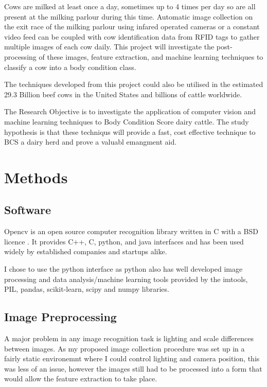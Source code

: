 \documentclass[11pt]{article}
\begin{document}
		
		Cows are milked at least once a day, sometimes up to 4 times per day so are all present at the milking parlour during this time.
		Automatic image collection on the exit race of the milking parlour using infared operated cameras or a constant video feed can be coupled with cow identification data from RFID tags to gather multiple images of each cow daily.  
		This project will investigate the post-processing of these images, feature extraction, and machine learning techniques to classify a cow into a body condition class.  


		The techniques developed from this project could also be utilised in the estimated 29.3 Billion beef cows in the United States\cite{USDA2013} and billions of cattle worldwide.

		The Research Objective is to investigate the application of computer vision and machine learning techniques to Body Condition Score dairy cattle.
		The study hypothesis is that these techniqus will provide a fast, cost effective technique to BCS a dairy herd and prove a valuabl emangment aid.


\section{Methods}

\subsection{Software}
	Opencv is an open source computer recognition library written in C with a BSD licence \cite{opencv_library}.
	It provides C++, C, python, and java interfaces and has been used widely by established companies and startups alike.


	I chose to use the python interface as python also has well developed image processing and data analysis/machine learning tools provided by the imtools, PIL, pandas, scikit-learn, scipy and numpy libraries.

\subsection{Image Preprocessing}
	A major problem in any image recognition task is lighting and scale differences between images.
	As my proposed image collection procedure was set up in a fairly static environemnt where I could control lighting and camera position, this was less of an issue, however the images still had to be processed into a form that would allow the feature extraction to take place.
\end{document}
